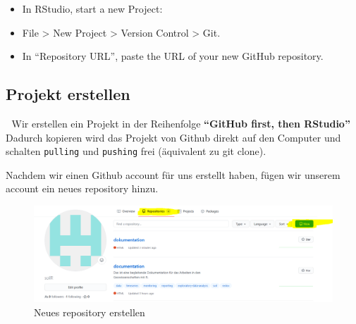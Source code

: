 \documentclass[
]{article}
\providecommand{\tightlist}{%
  \setlength{\itemsep}{0pt}\setlength{\parskip}{0pt}}
\begin{document}
\begin{itemize}
  \begin{itemize}
  \tightlist
  \item
    In RStudio, start a new Project:
  \item
    File \textgreater{} New Project \textgreater{} Version Control \textgreater{} Git.
  \item
    In ``Repository URL'', paste the URL of your new GitHub
    repository.
  \end{itemize}
\end{itemize}

\hypertarget{projekt-erstellen}{%
\subsection{Projekt erstellen}\label{projekt-erstellen}}

🚨 Wir erstellen ein Projekt in der Reihenfolge \textbf{``GitHub first, then
RStudio''} Dadurch kopieren wird das Projekt von Github direkt auf den Computer und schalten \texttt{pulling} und \texttt{pushing} frei (äquivalent zu git clone).

Nachdem wir einen Github account für uns erstellt haben, fügen wir unserem account ein neues repository hinzu.

\begin{figure}

{\centering \includegraphics[width=1\linewidth]{images/077} 

}

\caption{Neues repository erstellen}\label{fig:unnamed-chunk-299}
\end{figure}
\end{document}
